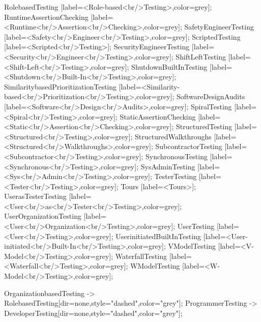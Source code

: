 \documentclass{article}
\begin{document}
{RolebasedTesting [label=<Role-based<br/>Testing>,color=grey];
RuntimeAssertionChecking [label=<Runtime<br/>Assertion<br/>Checking>,color=grey];
SafetyEngineerTesting [label=<Safety<br/>Engineer<br/>Testing>,color=grey];
ScriptedTesting [label=<Scripted<br/>Testing>];
SecurityEngineerTesting [label=<Security<br/>Engineer<br/>Testing>,color=grey];
ShiftLeftTesting [label=<Shift-Left<br/>Testing>,color=grey];
ShutdownBuiltInTesting [label=<Shutdown<br/>Built-In<br/>Testing>,color=grey];
SimilaritybasedPrioritizationTesting [label=<Similarity-based<br/>Prioritization<br/>Testing>,color=grey];
SoftwareDesignAudits [label=<Software<br/>Design<br/>Audits>,color=grey];
SpiralTesting [label=<Spiral<br/>Testing>,color=grey];
StaticAssertionChecking [label=<Static<br/>Assertion<br/>Checking>,color=grey];
StructuredTesting [label=<Structured<br/>Testing>,color=grey];
StructuredWalkthroughs [label=<Structured<br/>Walkthroughs>,color=grey];
SubcontractorTesting [label=<Subcontractor<br/>Testing>,color=grey];
SynchronousTesting [label=<Synchronous<br/>Testing>,color=grey];
SysAdminTesting [label=<Sys<br/>Admin<br/>Testing>,color=grey];
TesterTesting [label=<Tester<br/>Testing>,color=grey];
Tours [label=<Tours>];
UserasTesterTesting [label=<User<br/>as<br/>Tester<br/>Testing>,color=grey];
UserOrganizationTesting [label=<User<br/>Organization<br/>Testing>,color=grey];
UserTesting [label=<User<br/>Testing>,color=grey];
UserinitiatedBuiltInTesting [label=<User-initiated<br/>Built-In<br/>Testing>,color=grey];
VModelTesting [label=<V-Model<br/>Testing>,color=grey];
WaterfallTesting [label=<Waterfall<br/>Testing>,color=grey];
WModelTesting [label=<W-Model<br/>Testing>,color=grey];

OrganizationbasedTesting -> RolebasedTesting[dir=none,style="dashed",color="grey"];
ProgrammerTesting -> DeveloperTesting[dir=none,style="dashed",color="grey"];

}
\end{document}
